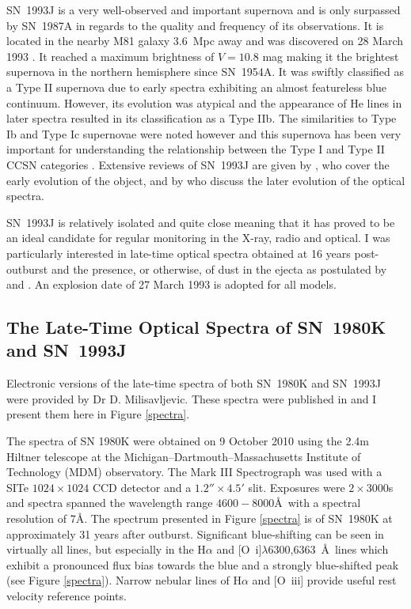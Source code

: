 SN~1993J is a very well-observed and important supernova and is only surpassed  by SN~1987A in regards to the quality and frequency of its observations.  It is located in the nearby M81 galaxy 3.6~Mpc away \citep{Freedman1994} and was discovered on 28 March 1993 \citep{Ripero1993}.  It reached a maximum brightness of $V=10.8$ mag making it the brightest supernova in the northern hemisphere since SN~1954A. It was swiftly classified as a Type II supernova due to early spectra exhibiting an almost featureless blue continuum.  However, its evolution was atypical and the appearance of He lines in later spectra resulted in its classification as a Type IIb.  The similarities to Type Ib and Type Ic supernovae were noted however and this supernova has been very important for understanding the relationship between the Type I and Type II CCSN categories \citep{Fillipenko1993,Garnavich1993}.  Extensive reviews of SN~1993J are given by \citet{Wheeler1996}, who cover the early evolution of the object, and by \citet{Matheson2000a,Matheson2000b} who discuss the later evolution of the optical spectra.  

SN~1993J is relatively isolated and quite close meaning that it has proved to be an ideal candidate for regular monitoring in the X-ray, radio and optical.  I was particularly interested in late-time optical spectra obtained at 16 years post-outburst and the presence, or otherwise, of dust in the ejecta as postulated by \citet{Fransson2005} and \citet{Milisavljevic2012}.  An explosion date of 27 March 1993 \citep{Baron1993} is adopted for all models.

\subsection{The Late-Time Optical Spectra of SN~1980K and SN~1993J}

Electronic versions of the late-time spectra of both SN~1980K and SN~1993J were provided by Dr D. Milisavljevic.  These spectra were published in \citet{Milisavljevic2012} and I present them here in Figure \ref{spectra}.

The spectra of SN 1980K were obtained on 9 October 2010 using the  2.4m Hiltner telescope at the Michigan--Dartmouth--Massachusetts Institute of Technology (MDM) observatory. The Mark III Spectrograph was used with a SITe $1024 \times 1024$ CCD detector and a $1.2'' \times 4.5'$ slit. Exposures were $2 \times 3000$s and spectra spanned the wavelength range $4600-8000$\AA\ with a spectral resolution of 7\AA. The spectrum presented in Figure \ref{spectra} is of SN~1980K at approximately 31 years after outburst. Significant blue-shifting can be seen in virtually all lines, but especially in the H$\alpha$ and [O~{\sc i}]$\lambda$6300,6363~\AA\ lines which exhibit a pronounced flux bias towards the blue and a strongly blue-shifted peak (see Figure \ref{spectra}).  Narrow nebular lines of H$\alpha$ and [O~{\sc iii}] provide useful rest velocity reference points.

